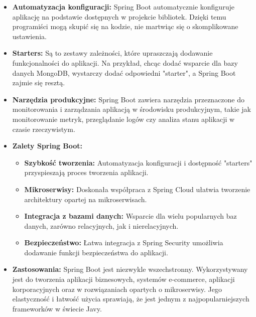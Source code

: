 \begin{itemize}
\item \textbf{Automatyzacja konfiguracji:} Spring Boot automatycznie konfiguruje aplikację na podstawie dostępnych w projekcie bibliotek. Dzięki temu programiści mogą skupić się na kodzie, nie martwiąc się o skomplikowane ustawienia.
\item \textbf{Starters:} Są to zestawy zależności, które upraszczają dodawanie funkcjonalności do aplikacji. Na przykład, chcąc dodać wsparcie dla bazy danych MongoDB, wystarczy dodać odpowiedni "starter", a Spring Boot zajmie się resztą.

\item \textbf{Narzędzia produkcyjne:} Spring Boot zawiera narzędzia przeznaczone do monitorowania i zarządzania aplikacją w środowisku produkcyjnym, takie jak monitorowanie metryk, przeglądanie logów czy analiza stanu aplikacji w czasie rzeczywistym.

\item \textbf{Zalety Spring Boot:}
\begin{itemize}
    \item \textbf{Szybkość tworzenia:} Automatyzacja konfiguracji i dostępność "starters" przyspieszają proces tworzenia aplikacji.
    \item \textbf{Mikroserwisy:} Doskonała współpraca z Spring Cloud ułatwia tworzenie architektury opartej na mikroserwisach.
    \item \textbf{Integracja z bazami danych:} Wsparcie dla wielu popularnych baz danych, zarówno relacyjnych, jak i nierelacyjnych.
    \item \textbf{Bezpieczeństwo:} Łatwa integracja z Spring Security umożliwia dodawanie funkcji bezpieczeństwa do aplikacji.
\end{itemize}

\item \textbf{Zastosowania:} Spring Boot jest niezwykle wszechstronny. Wykorzystywany jest do tworzenia aplikacji biznesowych, systemów e-commerce, aplikacji korporacyjnych oraz w rozwiązaniach opartych o mikroserwisy. Jego elastyczność i łatwość użycia sprawiają, że jest jednym z najpopularniejszych frameworków w świecie Javy.
\end{itemize}

